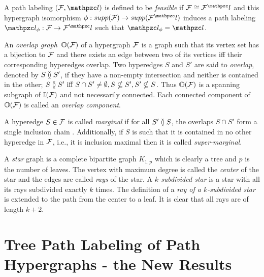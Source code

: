 \documentclass[MS]             %
              {iitmdiss_as}    %
\begin{document}
A path labeling $(\cF, \cl)$ is defined to be {\em
  feasible} if
$\cF \cong \cF^\cl$ and this hypergraph isomorphism $\phi: supp(\cF)
\rightarrow supp(\cF^\cl)$ induces a path labeling $\cl_\phi: \cF
\rightarrow \cF^\cl$ such that $\cl_\phi = \cl$. 

An {\em overlap graph}\, $\mathbb O({\cal F})$ of a hypergraph ${\cal F}$ is
a graph such that its vertex set has a bijection to ${\cal F}$ and there
exists an edge between two of its vertices iff their corresponding
hyperedges overlap. Two hyperedges $S$ and $S'$ are said to {\em
  overlap}, denoted by $S \between S'$, if they have a non-empty
intersection and neither is contained in the other; $S \between S'
\text{ iff } S \cap S' \ne \emptyset, S \nsubseteq S', S' \nsubseteq
S$. Thus $\mathbb O({\cal F})$ is a spanning subgraph of $\mathbb I({\cal F})$ and not
necessarily connected. Each connected component of $\mathbb O({\cal F})$ is
called an {\em overlap component}.


A hyperedge $S \in {\cal F}$ is called {\em marginal} if for all $S'
\between S$, the overlaps $S \cap S'$ form a single inclusion chain
\cite{kklv10}. Additionally, if $S$ is such that it is contained in no
other hyperedge in ${\cal F}$, i.e., it is inclusion maximal then it is called
{\em super-marginal}.

A {\em star} graph is a complete bipartite graph $K_{1,p}$
which is clearly a tree and $p$ is the number of leaves. The vertex
with maximum degree is called the {\em center} of the star and the
edges are called {\em rays} of the star. A {\em $k$-subdivided star}
is a star with all its rays subdivided exactly $k$ times. The
definition of a {\em ray of a $k$-subdivided star} is extended to the path
from the center to a leaf. It is clear that all rays are of length $k+2$.


\chapter{Tree Path Labeling of Path Hypergraphs - the New Results}
\end{document}
